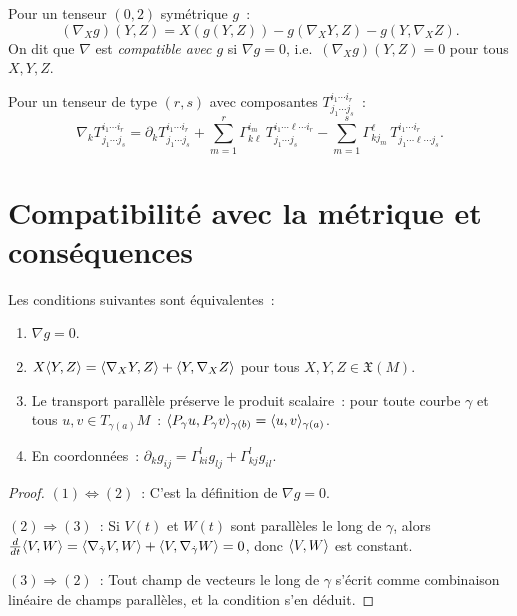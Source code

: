 \begin{proposition}
Pour un tenseur $(0,2)$ sym\'etrique $g$~:
\[
    (\nabla_X g)(Y, Z) = X(g(Y,Z)) - g(\nabla_X Y, Z) - g(Y, \nabla_X Z).
\]
On dit que $\nabla$ est \emph{compatible avec $g$} si $\nabla g = 0$, i.e.\
$(\nabla_X g)(Y,Z) = 0$ pour tous $X, Y, Z$.
\end{proposition}

\begin{formules}[title=\textbf{D\'eriv\'ee covariante en coordonn\'ees}]
Pour un tenseur de type $(r, s)$ avec composantes $T^{i_1 \cdots i_r}_{j_1 \cdots j_s}$~:
\[
    \nabla_k T^{i_1 \cdots i_r}_{j_1 \cdots j_s}
    = \partial_k T^{i_1 \cdots i_r}_{j_1 \cdots j_s}
    + \sum_{m=1}^r \Gamma^{i_m}_{k\ell}\, T^{i_1 \cdots \ell \cdots i_r}_{j_1 \cdots j_s}
    - \sum_{m=1}^s \Gamma^\ell_{k j_m}\, T^{i_1 \cdots i_r}_{j_1 \cdots \ell \cdots j_s}.
\]
\end{formules}

\section{Compatibilit\'e avec la m\'etrique et cons\'equences}

\begin{proposition}
Les conditions suivantes sont \'equivalentes~:
\begin{enumerate}
    \item $\nabla g = 0$.
    \item $X \langle Y, Z \rangle = \langle \nabla_X Y, Z \rangle + \langle Y, \nabla_X Z \rangle$
          pour tous $X, Y, Z \in \mathfrak{X}(M)$.
    \item Le transport parall\`ele pr\'eserve le produit scalaire~: pour toute courbe
          $\gamma$ et tous $u, v \in T_{\gamma(a)}M$~:
          $\langle P_\gamma u, P_\gamma v \rangle_{\gamma(b)} = \langle u, v \rangle_{\gamma(a)}$.
    \item En coordonn\'ees~: $\partial_k g_{ij} = \Gamma^l_{ki} g_{lj} + \Gamma^l_{kj} g_{il}$.
\end{enumerate}
\end{proposition}

\begin{proof}
$(1) \Leftrightarrow (2)$~: C'est la d\'efinition de $\nabla g = 0$.

$(2) \Rightarrow (3)$~: Si $V(t)$ et $W(t)$ sont parall\`eles le long de $\gamma$,
alors $\frac{d}{dt}\langle V, W \rangle = \langle \nabla_{\dot\gamma}V, W \rangle
+ \langle V, \nabla_{\dot\gamma}W \rangle = 0$, donc $\langle V, W \rangle$ est constant.

$(3) \Rightarrow (2)$~: Tout champ de vecteurs le long de $\gamma$ s'\'ecrit
comme combinaison lin\'eaire de champs parall\`eles, et la condition s'en d\'eduit.
\end{proof}

